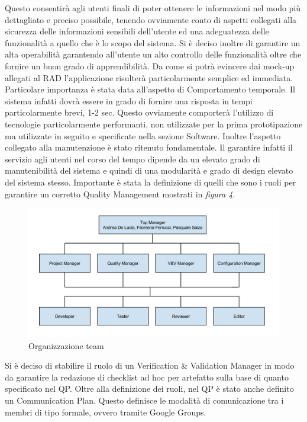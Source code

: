 Questo consentirà agli utenti finali di poter ottenere le informazioni nel modo più dettagliato e preciso possibile, tenendo ovviamente conto di aspetti collegati alla sicurezza delle informazioni sensibili dell’utente ed una adeguatezza delle funzionalità a quello che è lo scopo del sistema.
Si è deciso inoltre di garantire un alta operabilità garantendo all’utente un alto controllo delle funzionalità oltre che fornire un buon grado di apprendibilità.
Da come si potrà evincere dai mock-up allegati al RAD l’applicazione risulterà particolarmente semplice ed immediata.
Particolare importanza è stata data all’aspetto di Comportamento temporale. Il sistema infatti dovrà essere in grado di fornire una risposta in tempi particolarmente brevi, 1-2 sec.
Questo ovviamente comporterà l’utilizzo di tecnologie particolarmente performanti, non utilizzate per la prima prototipazione ma utilizzate in seguito e specificate nella sezione Software.
Inoltre l’aspetto collegato alla manutenzione è stato ritenuto fondamentale. Il garantire infatti il servizio agli utenti nel corso del tempo dipende da un elevato grado di manutenibilità del sistema e quindi di una modularità e grado di design elevato del sistema stesso.
Importante è stata la definizione di quelli che sono i ruoli per garantire un corretto Quality Management mostrati in \emph{figura 4}.
\begin{figure}[tp]
\centering
\includegraphics[scale=.7]{img/10.png}
\caption{Organizzazione team}
\label{fig:cd}
\end{figure}
Si è deciso di stabilire il ruolo di un Verification \& Validation Manager in modo da garantire la redazione di checklist ad hoc per artefatto sulla base di quanto specificato nel QP.
Oltre alla definizione dei ruoli, nel QP è stato anche definito un Communication Plan. Questo definisce le modalità di comunicazione tra i membri di tipo formale, ovvero tramite Google Groups.
